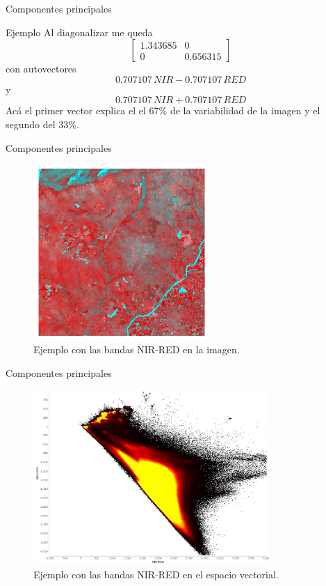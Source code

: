 \documentclass[handout]{beamer}
\begin{document}
\begin{frame}{Componentes principales}
  \begin{exampleblock}{Ejemplo}
    Al diagonalizar me queda
    \[
    \begin{bmatrix}
        1.343685       & 0 \\
        0       & 0.656315
    \end{bmatrix} \]
    con autovectores $$0.707107\, NIR-0.707107 \, RED$$  y $$0.707107 \, NIR+0.707107\, RED$$ \pause
    Ac\'a el primer vector explica el el 67\% de la variabilidad de la imagen y el segundo del 33\%.
  \end{exampleblock}
\end{frame}

\begin{frame}{Componentes principales}
  \begin{figure}
  \centering
  \includegraphics[width=0.6\textwidth]{imagenes/pca1.png}
  \caption{Ejemplo con las bandas NIR-RED en la imagen.}
  \end{figure}
\end{frame}

\begin{frame}{Componentes principales}
  \begin{figure}
  \centering
  \includegraphics[width=0.8\textwidth]{imagenes/pca2.png}
  \caption{Ejemplo con las bandas NIR-RED en el espacio vectorial.}
  \end{figure}
\end{frame}
\end{document}
